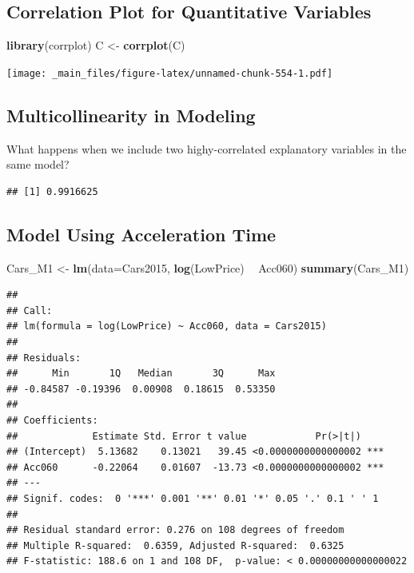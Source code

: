 \documentclass[]{book}
\newenvironment{Shaded}{\begin{snugshade}}{\end{snugshade}}
\newcommand{\KeywordTok}[1]{\textcolor[rgb]{0.13,0.29,0.53}{\textbf{#1}}}
\newcommand{\DataTypeTok}[1]{\textcolor[rgb]{0.13,0.29,0.53}{#1}}
\newcommand{\StringTok}[1]{\textcolor[rgb]{0.31,0.60,0.02}{#1}}
\newcommand{\OperatorTok}[1]{\textcolor[rgb]{0.81,0.36,0.00}{\textbf{#1}}}
\newcommand{\NormalTok}[1]{#1}
\begin{document}
\subsection{Correlation Plot for Quantitative
Variables}\label{correlation-plot-for-quantitative-variables}

\begin{Shaded}
\begin{Highlighting}[]
\KeywordTok{library}\NormalTok{(corrplot)}
\NormalTok{C <-}\StringTok{ }\KeywordTok{corrplot}\NormalTok{(C)}
\end{Highlighting}
\end{Shaded}

\texttt{[image: \_main\_files/figure-latex/unnamed-chunk-554-1.pdf]}

\subsection{Multicollinearity in
Modeling}\label{multicollinearity-in-modeling}

What happens when we include two highy-correlated explanatory variables
in the same model?

\begin{Shaded}
\end{Shaded}

\begin{verbatim}
## [1] 0.9916625
\end{verbatim}

\subsection{Model Using Acceleration
Time}\label{model-using-acceleration-time}

\begin{Shaded}
\begin{Highlighting}[]
\NormalTok{Cars_M1 <-}\StringTok{ }\KeywordTok{lm}\NormalTok{(}\DataTypeTok{data=}\NormalTok{Cars2015, }\KeywordTok{log}\NormalTok{(LowPrice) }\OperatorTok{~}\StringTok{ }\NormalTok{Acc060)}
\KeywordTok{summary}\NormalTok{(Cars_M1)}
\end{Highlighting}
\end{Shaded}

\begin{verbatim}
## 
## Call:
## lm(formula = log(LowPrice) ~ Acc060, data = Cars2015)
## 
## Residuals:
##      Min       1Q   Median       3Q      Max 
## -0.84587 -0.19396  0.00908  0.18615  0.53350 
## 
## Coefficients:
##             Estimate Std. Error t value            Pr(>|t|)    
## (Intercept)  5.13682    0.13021   39.45 <0.0000000000000002 ***
## Acc060      -0.22064    0.01607  -13.73 <0.0000000000000002 ***
## ---
## Signif. codes:  0 '***' 0.001 '**' 0.01 '*' 0.05 '.' 0.1 ' ' 1
## 
## Residual standard error: 0.276 on 108 degrees of freedom
## Multiple R-squared:  0.6359, Adjusted R-squared:  0.6325 
## F-statistic: 188.6 on 1 and 108 DF,  p-value: < 0.00000000000000022
\end{verbatim}
\end{document}
